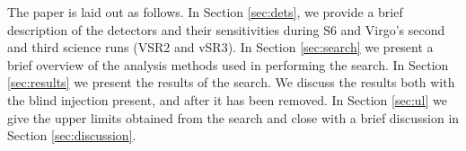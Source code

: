 \documentclass[prd,superscriptaddress,showpacs,amssymb,amsmath,amsfonts,aps,altaffilletter,nofootinbib,letterpaper,twocolumn]{revtex4}
\def\sfivelvc{S5LowMassLV}
\def\dogDate{16 September 2010}
\def\dogFAR{1 in $7,000$ years}
\begin{document}


  
The paper is laid out as follows.  In Section \ref{sec:dets}, we provide
a brief description of the detectors and their sensitivities during
\ac{S6} and Virgo's second and third science runs (VSR2 and vSR3). In
Section \ref{sec:search} we present a brief overview of the analysis
methods used in performing the search.  In Section \ref{sec:results} we
present the results of the search.  We discuss the results both with the
blind injection present, and after it has been removed.  In Section
\ref{sec:ul} we give the upper limits obtained from the search and close
with a brief discussion in Section \ref{sec:discussion}.
\end{document}
